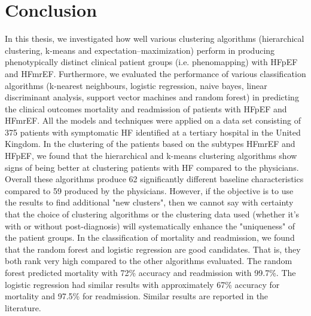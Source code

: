 \documentclass[../thesis.tex]{subfiles}
\begin{document}
\chapter{Conclusion}
\label{chap:conc}

\noindent In this thesis, we investigated how well various clustering algorithms (hierarchical clustering, k-means and expectation–maximization) perform in producing phenotypically distinct clinical patient groups (i.e. phenomapping) with HFpEF and HFmrEF. Furthermore, we evaluated the performance of various classification algorithms (k-nearest neighbours, logistic regression, naive bayes, linear discriminant analysis, support vector machines and random forest) in predicting the clinical outcomes mortality and readmission of patients with HFpEF and HFmrEF. All the models and techniques were applied on a data set consisting of 375 patients with symptomatic HF identified at a tertiary hospital in the United Kingdom. In the clustering of the patients based on the subtypes HFmrEF and HFpEF, we found that the hierarchical and k-means clustering algorithms show signs of being better at clustering patients with HF compared to the physicians. Overall these algorithms produce 62 significantly different baseline characteristics compared to 59 produced by the physicians. However, if the objective is to use the results to find additional "new clusters", then we cannot say with certainty that the choice of clustering algorithms or the clustering data used (whether it's with or without post-diagnosis) will systematically enhance the "uniqueness" of the patient groups. In the classification of mortality and readmission, we found that the random forest and logistic regression are good candidates. That is, they both rank very high compared to the other algorithms evaluated. The random forest predicted mortality with 72\% accuracy and readmission with 99.7\%. The logistic regression had similar results with approximately 67\% accuracy for mortality and 97.5\% for readmission. Similar results are reported in the literature.
\end{document}
